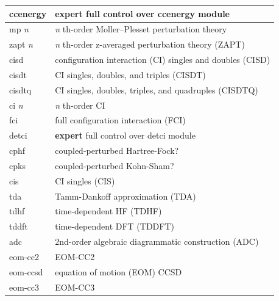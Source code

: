\documentclass[letterpaper,10pt,english]{sphinxmanual}
\begin{document}
\begin{fulllineitems}
\begin{longtable}{|l|l|}
ccenergy
 & 
\textbf{expert} full control over ccenergy module
\\\hline

mp \emph{n}
 & 
\emph{n} th-order Moller--Plesset perturbation theory
\\\hline

zapt \emph{n}
 & 
\emph{n} th-order z-averaged perturbation theory (ZAPT)
\\\hline

cisd
 & 
configuration interaction (CI) singles and doubles (CISD)
\\\hline

cisdt
 & 
CI singles, doubles, and triples (CISDT)
\\\hline

cisdtq
 & 
CI singles, doubles, triples, and quadruples (CISDTQ)
\\\hline

ci \emph{n}
 & 
\emph{n} th-order CI
\\\hline

fci
 & 
full configuration interaction (FCI)
\\\hline

detci
 & 
\textbf{expert} full control over detci module
\\\hline

cphf
 & 
coupled-perturbed Hartree-Fock?
\\\hline

cpks
 & 
coupled-perturbed Kohn-Sham?
\\\hline

cis
 & 
CI singles (CIS)
\\\hline

tda
 & 
Tamm-Dankoff approximation (TDA)
\\\hline

tdhf
 & 
time-dependent HF (TDHF)
\\\hline

tddft
 & 
time-dependent DFT (TDDFT)
\\\hline

adc
 & 
2nd-order algebraic diagrammatic construction (ADC)
\\\hline

eom-cc2
 & 
EOM-CC2
\\\hline

eom-ccsd
 & 
equation of motion (EOM) CCSD
\\\hline

eom-cc3
 & 
EOM-CC3
\\\hline
\end{longtable}



\end{fulllineitems}
\end{document}
